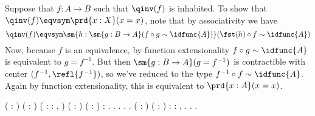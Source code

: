  \soln
Suppose that $f : A \to B$ such that $\qinv(f)$ is inhabited.  To show that
$\qinv(f) \eqvsym \prd{x:X}(x=x)$, note that by associativity we have
\[
  \qinv(f) \eqvsym 
  \sm{h : \sm{g : B \to A}(f \circ g \sim \idfunc{A})}
    (\fst(h) \circ f \sim \idfunc{A})
\]
Now, because $f$ is an equivalence, by function extensionality $f \circ g \sim
\idfunc{A}$ is equivalent to $g = f^{-1}$.  But then $\sm{g : B \to A}(g =
f^{-1})$ is contractible with center $(f^{-1}, \refl{f^{-1}})$, so we've
reduced to the type $f^{-1} \circ f \sim \idfunc{A}$.  Again by function
extensionality, this is equivalent to $\prd{x:A}(x=x)$.
\begin{coqdoccode}
\coqdocemptyline
\coqdocnoindent
{}  (  : ) (  :   ) ( : \coqdockw{\ensuremath{\forall}}  : ,   \coqdocnotation{=}  )\coqdoceol
\coqdocindent{4.50em}
(  : ) ( :  \coqdocnotation{=} )\coqdoceol
\coqdocindent{1.00em}
:     \coqdocnotation{=}        \coqdocnotation{(} \coqdocnotation{)\^{}}.\coqdoceol
\coqdocnoindent
{}.\coqdoceol
\coqdocindent{1.00em}
 .  .\coqdoceol
\coqdocnoindent
{}.\coqdoceol
\coqdocemptyline
\coqdocnoindent
{}  (  : ) ( :  \coqdocnotation{\ensuremath{\eqvsym}} ) :\coqdoceol
\coqdocindent{1.00em}
  \coqdocnotation{\ensuremath{\eqvsym}} \coqdockw{\ensuremath{\forall}}  : ,  \coqdocnotation{=} .\coqdoceol
\coqdocnoindent
{}.\coqdoceol
\coqdocindent{1.00em}
 .\coqdoceol

\end{coqdoccode}
